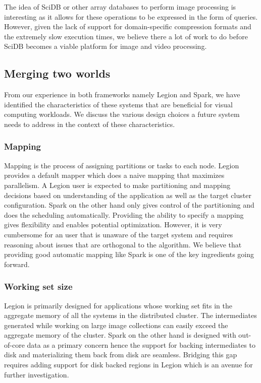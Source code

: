 \documentclass[tog]{acmsiggraph}
\begin{document}
The idea of SciDB or other array databases to perform image processing is
interesting as it allows for these operations to be expressed in the form of
queries. However, given the lack of support for domain-specific compression
formats and the extremely slow execution times, we believe there a lot of work
to do before SciDB becomes a viable platform for image and video processing.

\subsection{Merging two worlds}

From our experience in both frameworks namely Legion and Spark, we have
identified the characteristics of these systems that are beneficial for visual
computing workloads. We discuss the various design choices a future system needs
to address in the context of these characteristics.

\subsubsection{Mapping}
Mapping is the process of assigning partitions or tasks to each node. Legion
provides a default mapper which does a naive mapping that maximizes parallelism.
A Legion user is expected to make partitioning and mapping decisions based on
understanding of the application as well as the target cluster configuration.
Spark on the other hand only gives control of the partitioning and does the
scheduling automatically. Providing the ability to specify a mapping gives
flexibility and enables potential optimization. However, it is very cumbersome
for an user that is unaware of the target system and requires reasoning about
issues that are orthogonal to the algorithm. We believe that providing good
automatic mapping like Spark is one of the key ingredients going forward.

\subsubsection{Working set size}
Legion is primarily designed for applications whose working set fits in the
aggregate memory of all the systems in the distributed cluster. The
intermediates generated while working on large image collections can easily
exceed the aggregate memory of the cluster. Spark on the other hand is designed
with out-of-core data as a primary concern hence the support for backing
intermediates to disk and materializing them back from disk are
seamless. Bridging this gap requires adding support for disk backed regions in
Legion which is an avenue for further investigation.
\end{document}
